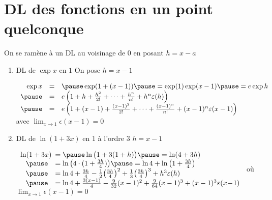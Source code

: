 \section{DL des fonctions en un point quelconque}

\begin{frame}


\pause

On se ramène à un DL au voisinage de $0$ en posant $h=x-a$

\pause

\begin{exemple}
\begin{enumerate}
  \item DL de $\exp x$ en $1$ 
\pause \qquad 
On pose $h=x-1$ 

\pause
\medskip

\hspace*{-2em}
$\begin{array}{rcl}
  \exp x & = & \pause \exp( 1+ (x-1) ) \pause = \exp(1) \exp (x-1) \pause = e \exp h \\
\pause
& = & e \left(1+h+ \frac{h^2}{2!} + \cdots + \frac{h^n}{n!}+h^n\epsilon(h)\right) \\
\pause
& =  & e \left(1+(x-1)+\frac{(x-1)^2}{2!}+\cdots
+\frac{(x-1)^n}{n!}+(x-1)^n\epsilon(x-1)\right) \\
\end{array}$
\pause
avec  \quad $\lim_{x\to1}\epsilon(x-1)=0$
\pause

  \item DL de $\ln(1+3x)$ en $1$ à l'ordre $3$
\pause \qquad  
$h=x-1$

\pause
\medskip

\hspace*{-3em}
$\begin{array}{rl}
\ln(1+3x)\!\!\! &= \pause \ln\big(1+3(1+h)\big) \pause =  \ln(4 + 3h) \\
 \pause 
&= \ln\big(4 \cdot (1+\frac{3h}{4})\big) \pause = \ln 4 + \ln\big(1+\frac{3h}{4}\big) \\
\pause
&= \ln 4 + \frac{3h}{4} - \frac12 \big(\frac{3h}{4} \big)^2
+ \frac13 \big(\frac{3h}{4} \big)^3 + h^3 \epsilon(h) \\
\pause
&= \ln 4 + \frac{3(x-1)}{4} - \frac{9}{32}(x-1)^2
+ \frac{9}{64}(x-1)^3 + (x-1)^3 \epsilon(x\!-\!1)
\end{array}$
\pause
 où $\lim_{x\to1}\epsilon(x-1)=0$

\end{enumerate}
\end{exemple}
  
\end{frame}


